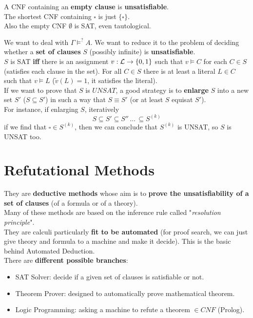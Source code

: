 A CNF containing an \textbf{empty clause} is \textbf{unsatisfiable}.\\
The shortest CNF containing $\square$ is just $\{\square\}$.\\
Also the empty CNF $\emptyset$ is SAT, even tautological.\\

\newpage

We want to deal with $\Gamma \models^? A$. We want to reduce it to the problem of deciding whether a \textbf{set of clauses} $S$ (possibly infinite) is \textbf{unsatisfiable}.\\

$S$ is SAT \textbf{iff} there is an assignment $v: \mathcal{L} \rightarrow \{0,1\}$ such that $v \models C$ for each $C \in S$ (satisfies each clause in the set). For all $C \in S$ there is at least a literal $L \in C$ such that $v \models L$ ($\tilde v (L) = 1$, it satisfies the literal).\\

If we want to prove that $S$ is $UNSAT$, a good strategy is to \textbf{enlarge} $S$ into a new set $S'$ ($S \subseteq S'$) in such a way that $S \equiv S'$ (or at least $S$ equisat $S'$).\\

For instance, if enlarging $S$, iteratively 
$$ S \subseteq S' \subseteq S'' \, \dots \, \subseteq S^{(k)}$$
if we find that $\square \in S^{(k)}$, then we can conclude that $S^{(k)}$ is UNSAT, so $S$ is UNSAT too.\\

\newpage

\section{Refutational Methods}

They are \textbf{deductive methods} whose aim is to \textbf{prove the unsatisfiability of a set of clauses} (of a formula or of a theory).\\

Many of these methods are based on the inference rule called "\textit{resolution principle}".\\

They are calculi particularly \textbf{fit to be automated} (for proof search, we can just give theory and formula to a machine and make it decide). This is the basic behind Automated Deduction.\\ 

There are \textbf{different possible branches}:
\begin{itemize}
	\item SAT Solver: decide if a given set of clauses is satisfiable or not.\\
	
	\item Theorem Prover: designed to automatically prove mathematical theorem.\\
	
	\item Logic Programming: asking a machine to refute a theorem $\in CNF$ (Prolog).\\
\end{itemize}

